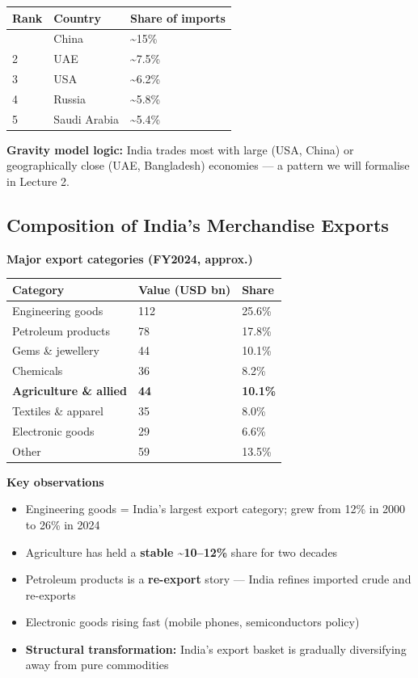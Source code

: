 \documentclass[
  letterpaper,
  DIV=11,
  numbers=noendperiod]{scrartcl}
\providecommand{\tightlist}{%
  \setlength{\itemsep}{0pt}\setlength{\parskip}{0pt}}
\begin{document}
\begin{longtable}[]{@{}lll@{}}
\toprule\noalign{}
Rank & Country & Share of imports \\
\midrule\noalign{}
\endhead
\bottomrule\noalign{}
\endlastfoot
1 & China & \textasciitilde15\% \\
2 & UAE & \textasciitilde7.5\% \\
3 & USA & \textasciitilde6.2\% \\
4 & Russia & \textasciitilde5.8\% \\
5 & Saudi Arabia & \textasciitilde5.4\% \\
\end{longtable}

\textbf{Gravity model logic:} India trades most with large (USA, China)
or geographically close (UAE, Bangladesh) economies --- a pattern we
will formalise in Lecture 2.

\subsection{Composition of India's Merchandise
Exports}\label{composition-of-indias-merchandise-exports}

\textbf{Major export categories (FY2024, approx.)}

\begin{longtable}[]{@{}lll@{}}
\toprule\noalign{}
Category & Value (USD bn) & Share \\
\midrule\noalign{}
\endhead
\bottomrule\noalign{}
\endlastfoot
Engineering goods & 112 & 25.6\% \\
Petroleum products & 78 & 17.8\% \\
Gems \& jewellery & 44 & 10.1\% \\
Chemicals & 36 & 8.2\% \\
\textbf{Agriculture \& allied} & \textbf{44} & \textbf{10.1\%} \\
Textiles \& apparel & 35 & 8.0\% \\
Electronic goods & 29 & 6.6\% \\
Other & 59 & 13.5\% \\
\end{longtable}

\textbf{Key observations}

\begin{itemize}
\tightlist
\item
  Engineering goods = India's largest export category; grew from 12\% in
  2000 to 26\% in 2024
\item
  Agriculture has held a \textbf{stable \textasciitilde10--12\%} share
  for two decades
\item
  Petroleum products is a \textbf{re-export} story --- India refines
  imported crude and re-exports
\item
  Electronic goods rising fast (mobile phones, semiconductors policy)
\item
  \textbf{Structural transformation:} India's export basket is gradually
  diversifying away from pure commodities
\end{itemize}
\end{document}
